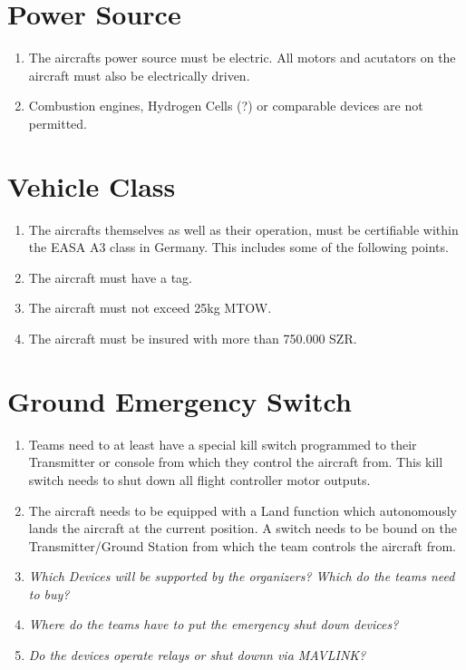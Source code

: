 \documentclass{article}
\begin{document}


\tableofcontents{}
\newpage

\section{Power Source}
\begin{enumerate}
  \item The aircrafts power source must be electric. All motors and acutators on the aircraft must also be electrically driven.
  \item Combustion engines, Hydrogen Cells (?) or comparable devices are not permitted. 
\end{enumerate}

\section{Vehicle Class}
\begin{enumerate}
  \item The aircrafts themselves as well as their operation, must be certifiable within the EASA A3 class in Germany. This includes some of the following points.
  \item The aircraft must have a tag.
  \item The aircraft must not exceed 25kg MTOW. 
  \item The aircraft must be insured with more than 750.000 SZR. 
\end{enumerate}

\section{Ground Emergency Switch}
\begin{enumerate}
  \item Teams need to at least have a special kill switch programmed to their Transmitter or console from which they control the aircraft from. This kill switch needs to shut down all flight controller motor outputs.
  \item The aircraft needs to be equipped with a Land function which autonomously lands the aircraft at the current position. A switch needs to be bound on the Transmitter/Ground Station from which the team controls the aircraft from.  
  \item \emph{Which Devices will be supported by the organizers? Which do the teams need to buy?}
  \item \emph{Where do the teams have to put the emergency shut down devices?}
  \item \emph{Do the devices operate relays or shut downn via MAVLINK?}
\end{enumerate}
\end{document}
